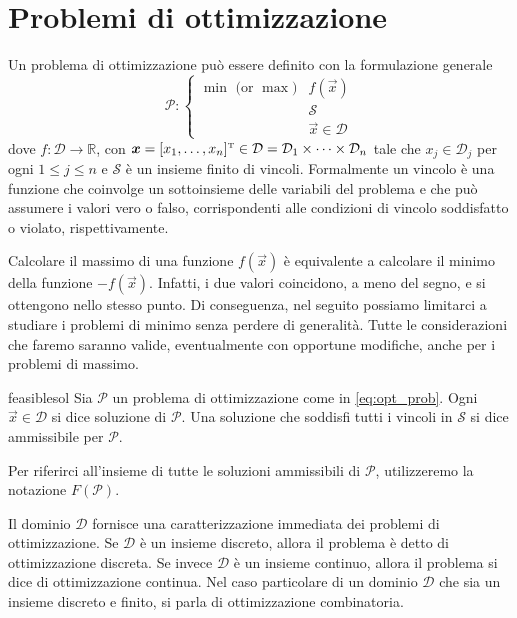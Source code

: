 \section{Problemi di ottimizzazione}\label{sec:opt_prob}
Un problema di ottimizzazione può essere definito con la formulazione generale
\begin{equation}\label{eq:opt_prob}
    \mathcal{P}\colon\left\{
    \begin{array}{ll}
        \min \text{ (or } \max) & f(\vec{x}) \\
                               & \mathcal{S} \\
                               & \vec{x} \in \mathcal{D}
    \end{array}\right.
\end{equation}
dove \( f\colon \mathcal{D} \to \mathbb{R}\), con \( \bm{x} = [x_1 ,\ldots,x_n]^{\scriptscriptstyle\mathrm{T}} \in \mathcal{D} = \mathcal{D}_1
\times \dots \times \mathcal{D}_n \) tale che \( x_j \in \mathcal{D}_j \) per ogni \( 1 \leq j \leq n \) e \(
\mathcal{S} \) è un insieme finito di vincoli. Formalmente un vincolo è una funzione che coinvolge un sottoinsieme delle
variabili del problema e che può assumere i valori vero o falso, corrispondenti alle condizioni di vincolo soddisfatto o
violato, rispettivamente.

Calcolare il massimo di una funzione
\(
    f(\vec{x})
\)
è equivalente a calcolare il minimo della funzione
\(
    -f(\vec{x})
\). Infatti, i due valori coincidono, a meno del segno, e si ottengono nello stesso punto.
Di conseguenza, nel seguito possiamo limitarci a studiare i problemi di minimo senza perdere di generalità. Tutte le
considerazioni che faremo saranno valide, eventualmente con opportune modifiche, anche per i problemi di massimo.

\begin{definition}{}{feasiblesol}
    Sia \( \mathcal{P} \) un problema di ottimizzazione come in \eqref{eq:opt_prob}. Ogni \( \vec{x} \in \mathcal{D} \)
    si dice soluzione di \( \mathcal{P} \). Una soluzione che soddisfi tutti i vincoli in \( \mathcal{S} \) si dice
    ammissibile per \( \mathcal{P} \).
\end{definition}
\noindent
Per riferirci all'insieme di tutte le soluzioni ammissibili di \( \mathcal{P} \), utilizzeremo la notazione \(
F(\mathcal{P}) \).

Il dominio \( \mathcal{D} \) fornisce una caratterizzazione immediata dei problemi di ottimizzazione. Se \( \mathcal{D}
\) è un insieme discreto, allora il problema è detto di ottimizzazione discreta. Se invece  \( \mathcal{D} \) è un
insieme continuo, allora il problema si dice di ottimizzazione continua. Nel caso particolare di un dominio \(
\mathcal{D} \) che sia un insieme discreto e finito, si parla di ottimizzazione combinatoria.

